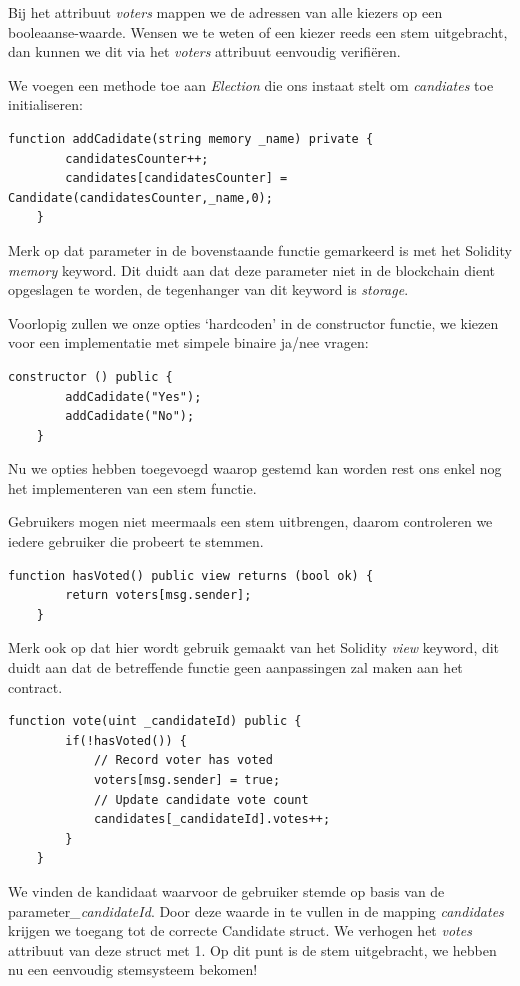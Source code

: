	Bij het attribuut \textit{voters} mappen we de adressen van alle kiezers op een booleaanse-waarde. Wensen we te weten of een kiezer reeds een stem uitgebracht, dan kunnen we dit via het \textit{voters} attribuut eenvoudig verifiëren. 
	
	We voegen een methode toe aan \textit{Election} die ons instaat stelt om  \textit{candiates} toe initialiseren:
	
	\begin{lstlisting}[numbers=none]
	function addCadidate(string memory _name) private {
		candidatesCounter++;
		candidates[candidatesCounter] = Candidate(candidatesCounter,_name,0);
	}
	\end{lstlisting}
	Merk op dat parameter in de bovenstaande functie gemarkeerd is met het Solidity \textit{memory} keyword. Dit duidt aan dat deze parameter niet in de blockchain dient opgeslagen te worden, de tegenhanger van dit keyword is \textit{storage}.
	
	Voorlopig zullen we onze opties `hardcoden' in de constructor functie, we kiezen voor een implementatie met simpele binaire ja/nee vragen:
	
	\begin{lstlisting}[numbers=none]
	constructor () public {
		addCadidate("Yes");
		addCadidate("No");
	}
	\end{lstlisting}
	
	Nu we opties hebben toegevoegd waarop gestemd kan worden rest ons enkel nog het implementeren van een stem functie. 
	
	Gebruikers mogen niet meermaals een stem uitbrengen, daarom controleren we iedere gebruiker die probeert te stemmen. 
	
	\begin{lstlisting}[numbers=none]
	function hasVoted() public view returns (bool ok) {
		return voters[msg.sender];
	}
	\end{lstlisting}
	
	Merk ook op dat hier wordt gebruik gemaakt van het Solidity \textit{view} keyword, dit duidt aan dat de betreffende functie geen aanpassingen zal maken aan het contract. 
	
	\begin{lstlisting}[numbers=none]
	function vote(uint _candidateId) public {
		if(!hasVoted()) {
			// Record voter has voted
			voters[msg.sender] = true;
			// Update candidate vote count
			candidates[_candidateId].votes++;
		}
	}
	\end{lstlisting}
	
	We vinden de kandidaat waarvoor de gebruiker stemde op basis van de parameter\textit{\_candidateId}. Door deze waarde in te vullen in de mapping \textit{candidates} krijgen we toegang tot de correcte Candidate struct. We verhogen het \textit{votes} attribuut van deze struct met 1. Op dit punt is de stem uitgebracht, we hebben nu een eenvoudig stemsysteem bekomen!
	
